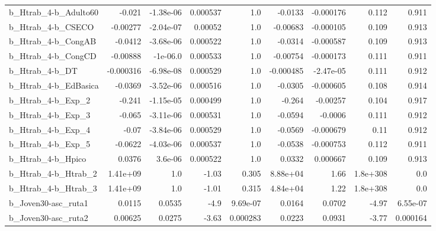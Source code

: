 \begin{tabular}{lrrrrrrrr}
b\_Htrab\_4-b\_Adulto60       &      -0.021 &    -1.38e-06 &  0.000537 &      1.0 &    -0.0133 &   -0.000176 &        0.112 &         0.911 \\
b\_Htrab\_4-b\_CSECO          &    -0.00277 &    -2.04e-07 &   0.00052 &      1.0 &   -0.00683 &   -0.000105 &        0.109 &         0.913 \\
b\_Htrab\_4-b\_CongAB         &     -0.0412 &    -3.68e-06 &  0.000522 &      1.0 &    -0.0314 &   -0.000587 &        0.109 &         0.913 \\
b\_Htrab\_4-b\_CongCD         &    -0.00888 &     -1e-06.0 &  0.000533 &      1.0 &   -0.00754 &   -0.000173 &        0.111 &         0.911 \\
b\_Htrab\_4-b\_DT             &   -0.000316 &    -6.98e-08 &  0.000529 &      1.0 &  -0.000485 &   -2.47e-05 &        0.111 &         0.912 \\
b\_Htrab\_4-b\_EdBasica       &     -0.0369 &    -3.52e-06 &  0.000516 &      1.0 &    -0.0305 &   -0.000605 &        0.108 &         0.914 \\
b\_Htrab\_4-b\_Exp\_2          &      -0.241 &    -1.15e-05 &  0.000499 &      1.0 &     -0.264 &    -0.00257 &        0.104 &         0.917 \\
b\_Htrab\_4-b\_Exp\_3          &      -0.065 &    -3.11e-06 &  0.000531 &      1.0 &    -0.0594 &     -0.0006 &        0.111 &         0.912 \\
b\_Htrab\_4-b\_Exp\_4          &       -0.07 &    -3.84e-06 &  0.000529 &      1.0 &    -0.0569 &   -0.000679 &         0.11 &         0.912 \\
b\_Htrab\_4-b\_Exp\_5          &     -0.0622 &    -4.03e-06 &  0.000537 &      1.0 &    -0.0538 &   -0.000753 &        0.112 &         0.911 \\
b\_Htrab\_4-b\_Hpico          &      0.0376 &      3.6e-06 &  0.000522 &      1.0 &     0.0332 &    0.000667 &        0.109 &         0.913 \\
b\_Htrab\_4-b\_Htrab\_2        &    1.41e+09 &          1.0 &     -1.03 &    0.305 &   8.88e+04 &        1.66 &     1.8e+308 &           0.0 \\
b\_Htrab\_4-b\_Htrab\_3        &    1.41e+09 &          1.0 &     -1.01 &    0.315 &   4.84e+04 &        1.22 &     1.8e+308 &           0.0 \\
b\_Joven30-asc\_ruta1        &      0.0115 &       0.0535 &      -4.9 & 9.69e-07 &     0.0164 &      0.0702 &        -4.97 &      6.55e-07 \\
b\_Joven30-asc\_ruta2        &     0.00625 &       0.0275 &     -3.63 & 0.000283 &     0.0223 &      0.0931 &        -3.77 &      0.000164 \\

\end{tabular}
